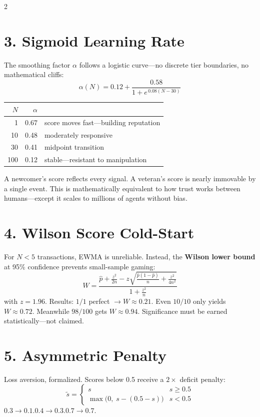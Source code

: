 \documentclass[10pt,a4paper]{article}
\begin{document}
\begin{multicols}{2}
\section{3.\; Sigmoid Learning Rate}

The smoothing factor $\alpha$ follows a logistic curve---no discrete tier boundaries, no mathematical cliffs:
%
\[
  \alpha(N) = 0.12 + \frac{0.58}{1 + e^{\,0.08(N-30)}}
\]
%
{\footnotesize
\begin{tabular}{@{}rrl@{}}
\toprule
$N$ & $\alpha$ & \\
\midrule
1   & 0.67 & score moves fast---building reputation \\
10  & 0.48 & moderately responsive \\
30  & 0.41 & midpoint transition \\
100 & 0.12 & stable---resistant to manipulation \\
\bottomrule
\end{tabular}}
\vspace{2pt}

A newcomer's score reflects every signal. A veteran's score is nearly immovable by a single event. This is mathematically equivalent to how trust works between humans---except it scales to millions of agents without bias.

\section{4.\; Wilson Score Cold-Start}

For $N < 5$ transactions, EWMA is unreliable. Instead, the \textbf{Wilson lower bound} at 95\% confidence prevents small-sample gaming:
%
\[
  W = \frac{
      \hat p + \frac{z^2}{2n}
      - z\sqrt{\frac{\hat p(1-\hat p)}{n}
               + \frac{z^2}{4n^2}}
    }{1 + \frac{z^2}{n}}
\]
%
with $z = 1.96$. Results: $1/1$ perfect $\to W \approx 0.21$. Even $10/10$ only yields $W \approx 0.72$. Meanwhile $98/100$ gets $W \approx 0.94$. Significance must be earned statistically---not claimed.

\section{5.\; Asymmetric Penalty}

Loss aversion, formalized. Scores below 0.5 receive a $2\times$ deficit penalty:
%
\[
  \tilde{s} = \begin{cases}
    s & s \ge 0.5 \\[2pt]
    \max\!\bigl(0,\; s - (0.5 - s)\bigr) & s < 0.5
  \end{cases}
\]
%
$0.3 \to 0.1$.\quad $0.4 \to 0.3$.\quad $0.7 \to 0.7$.


\end{multicols}
\end{document}
